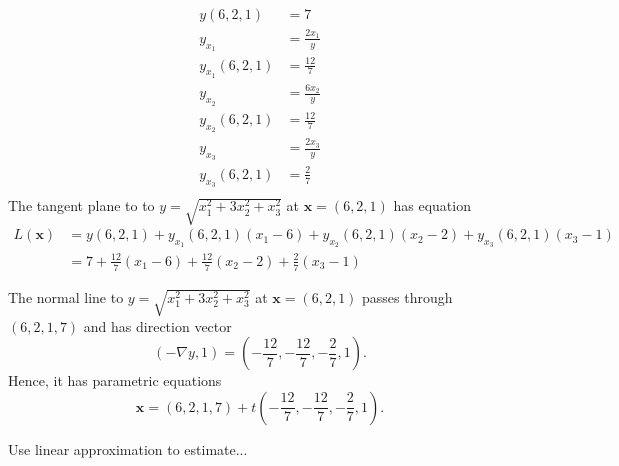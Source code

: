\documentclass[answers]{exam}
\begin{document}
\begin{questions}
\begin{parts}
        \begin{solution}
            \begin{align*}
                y(6,2,1) &= 7\\
                y_{x_1} &= \frac{2x_1}{y}\\
                y_{x_1}(6,2,1) &= \frac{12}{7}\\
                y_{x_2} &= \frac{6x_2}{y}\\
                y_{x_2}(6,2,1) &= \frac{12}{7}\\
                y_{x_3} &= \frac{2x_3}{y}\\
                y_{x_3}(6,2,1) &= \frac{2}{7}\\
            \end{align*}
            The tangent plane to to $y=\sqrt{x_1^2 + 3x_2^2 + x_3^2}$
            at $\mathbf{x}=(6, 2, 1)$ has equation
            \begin{align*}
                L(\mathbf{x}) &= y(6,2,1) + y_{x_1}(6,2,1)(x_1-6)
                + y_{x_2}(6,2,1)(x_2-2) + y_{x_3}(6,2,1)(x_3-1)\\
                &= 7 + \frac{12}7(x_1-6) + \frac{12}7(x_2-2) + \frac27(x_3-1)
            \end{align*}

            The normal line to $y=\sqrt{x_1^2 + 3x_2^2 + x_3^2}$
            at $\mathbf{x}=(6, 2, 1)$
            passes through $(6,2,1,7)$ and has direction vector
            \[
                (-\nabla y, 1) = \left(-\frac{12}7,-\frac{12}{7},-\frac27,1\right).
            \]
            Hence, it has parametric equations
            \[
                \mathbf{x} = (6,2,1,7) + t\left(-\frac{12}7,-\frac{12}{7},-\frac27,1\right).
            \]
        \end{solution}
    \end{parts}

    \question Use linear approximation to estimate...
\end{questions}
\end{document}
